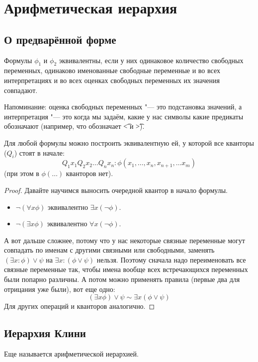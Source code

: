 \section{Арифметическая иерархия}
\subsection{О предварённой форме}
\begin{Def}
	Формулы $\phi_1$ и $\phi_2$ эквивалентны, если у них одинаковое количество свободных переменных,
	одинаково именованные свободные переменные и во всех интерпретациях и во всех оценках
	свободных переменных их значения совпадают.

	Напоминание: оценка свободных переменных "--- это подстановка значений,
	а интерпретация "--- это когда мы задаём, какие у нас символы какие предикаты обозначают
	(например, что обозначает \t{<} и \t{>}).
\end{Def}

\begin{lemma}
	Для любой формулы можно построить эквивалентную ей, у которой все кванторы ($Q_i$) стоят в начале:
	\[
	Q_1 x_1 Q_2 x_2 \dots Q_n x_n \colon \phi(x_1, \dots, x_n, x_{n+1}, \dots x_m)
	\]
	(при этом в $\phi(\dots)$ кванторов нет).
\end{lemma}
\begin{proof}
	Давайте научимся выносить очередной квантор в начало формулы.
	\begin{itemize}
	\item $\lnot (\forall x \phi)$ эквивалентно $\exists x (\lnot \phi)$.
	\item $\lnot (\exists x \phi)$ эквивалентно $\forall x (\lnot \phi)$.
	\end{itemize}
	А вот дальше сложнее, потому что у нас некоторые связные переменные могут совпадать
	по именам с другими связными или свободными, заменять $(\exists x \colon \phi) \lor \psi$
	на $\exists x \colon (\phi \lor \psi)$ нельзя.
	Поэтому сначала надо переименовать все связные переменные так, чтобы имена вообще всех
	встречающихся переменных были попарно различны.
	А потом можно применять правила (первые два для отрицания уже были), вот еще одно:
	\[ (\exists x \phi) \lor \psi \sim \exists x (\phi \lor \psi) \]
	Для других операций и кванторов аналогично.
\end{proof}

\subsection{Иерархия Клини}
Еще называется арифметической иерархией.

